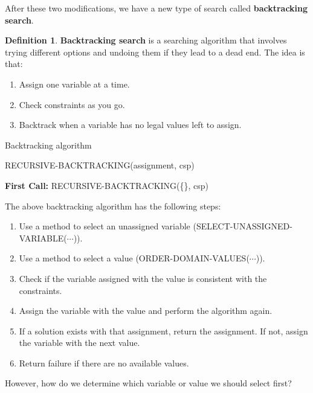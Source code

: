 \documentclass{article}
\theoremstyle{definition}
\newtheorem{definition}{Definition}[section]
\begin{document}
After these two modifications, we have a new type of search called \textbf{backtracking search}.
\begin{definition}
	\textbf{Backtracking search} is a searching algorithm that involves trying different options and undoing them if they lead to a dead end. The idea is that:
	\begin{enumerate}
		\item Assign one variable at a time.
		\item Check constraints as you go.
		\item Backtrack when a variable has no legal values left to assign.
	\end{enumerate}
\end{definition}

\newpage
\begin{algorithm}
\caption{Backtracking algorithm}
RECURSIVE-BACKTRACKING(assignment, csp)
\begin{algorithmic}
	\EndIf
			\EndIf
		\EndIf
	\EndFor
\end{algorithmic}
	\textbf{First Call: }RECURSIVE-BACKTRACKING(\{\}, csp)
\end{algorithm}
The above backtracking algorithm has the following steps:
\begin{enumerate}
	\item Use a method to select an unassigned variable (SELECT-UNASSIGNED-VARIABLE($\cdots$)).
	\item Use a method to select a value (ORDER-DOMAIN-VALUES($\cdots$)).
	\item Check if the variable assigned with the value is consistent with the constraints.
	\item Assign the variable with the value and perform the algorithm again.
	\item If a solution exists with that assignment, return the assignment. If not, assign the variable with the next value.
	\item Return failure if there are no available values.
\end{enumerate}
However, how do we determine which variable or value we should select first?
\end{document}
